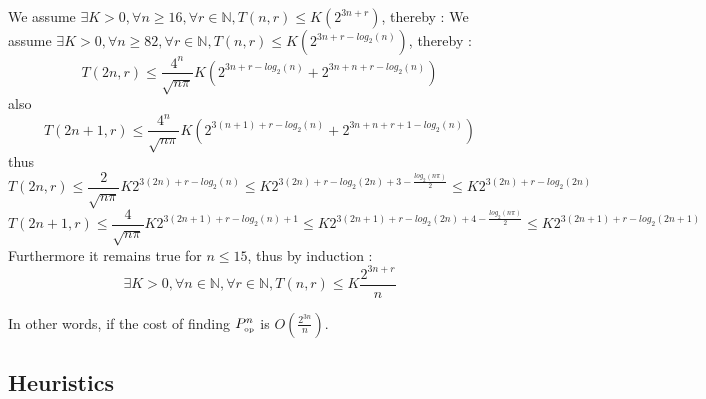\documentclass[11pt]{llncs}
\begin{document}
We assume $\exists K > 0, \forall n \geqslant 16, \forall r \in \mathbb{N}, T(n, r) \leqslant K(2^{3n+r})$, thereby :
We assume $\exists K > 0, \forall n \geqslant 82, \forall r \in \mathbb{N}, T(n, r) \leqslant K(2^{3n+r- log_{2} (n)})$, thereby :
\[
T(2n, r) \leqslant \frac{4^n}{\sqrt{n\pi}}K(2^{3n+r-log_{2} (n)}+2^{3n+n+r- log_{2} (n)})
\]
also
\[
T(2n+1, r) \leqslant \frac{4^n}{\sqrt{n\pi}}K(2^{3(n+1)+r- log_{2} (n)}+2^{3n+n+r+1- log_{2} (n)})
\]
thus
\[
T(2n, r) \leqslant \frac{2}{\sqrt{n\pi}}K2^{3(2n)+r- log_{2} (n)} \leqslant K2^{3(2n)+r- log_{2} (2n)+3 - \frac{log_{2}(n\pi)}{2}} \leqslant K2^{3(2n)+r-log_{2} (2n)}
\]
\[
T(2n+1, r) \leqslant \frac{4}{\sqrt{n\pi}}K2^{3(2n+1)+r-log_{2} (n)+1} \leqslant K2^{3(2n+1)+r-log_{2} (2n) +4 -\frac{log_{2}(n\pi)}{2}} \leqslant K2^{3(2n+1)+r- log_{2}(2n+1)}
\]
Furthermore it remains true for $n \leqslant 15$, thus by induction : 
\[
	 \exists K > 0, \forall n \in \mathbb{N}, \forall r \in \mathbb{N}, T(n, r) \leqslant K \frac{2^{3n+r}}{n}
\]

In other words, if the cost of finding $P_{\mbox{{\tiny op}}}^{n}$ is $O(\frac{2^{3n}}{n})$.






	\subsection{Heuristics}
\end{document}
